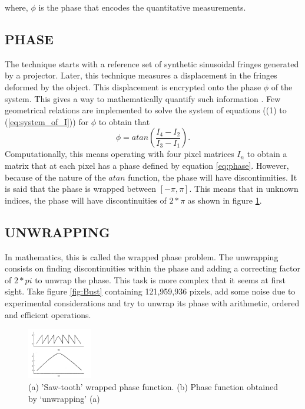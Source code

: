 where, $\phi$ is the phase that encodes the quantitative measurements. 

\subsection{PHASE}
The technique starts with a reference set of synthetic sinusoidal fringes generated by a projector. Later, this technique measures a displacement in the fringes deformed by the object. This displacement is encrypted onto the phase $\phi$ of the system. This gives a way to mathematically quantify such information  \cite{gaasvik2003optical}. Few geometrical relations are implemented to solve the system of equations ((1) to (\ref{eq:system_of_I}))  for $\phi$ to obtain that 
\begin{equation}
    \phi = atan(\frac{I_4-I_2}{I_3-I_1}).
    \label{eq:phase}
\end{equation}
Computationally, this means operating with four pixel matrices $I_n$ to obtain a matrix that at each pixel has a phase defined by equation \ref{eq:phase}. However, because of the nature of the $atan$ function, the phase will have discontinuities. It is said that the phase is wrapped between $[-\pi, \pi]$. This means that in unknown indices, the phase will have discontinuities of $2*\pi$ as shown in figure \ref{fig:WRAPunwrap}.\\


\subsection{UNWRAPPING}
In mathematics, this is called the wrapped phase problem. The unwrapping consists on finding discontinuities within the phase and adding a correcting factor of $2*pi$ to unwrap the phase\cite{Huntley:93}\cite{Ghiglia:94}. This task is more complex that it seems at first sight. Take figure \ref{fig:Bust} containing 121,959,936 pixels, add some noise due to experimental considerations and try to unwrap its phase with arithmetic, ordered and efficient operations. 

\begin{figure}[H]
    \centering
    \includegraphics[width=0.25\textwidth]{Figures/UnwrappIlustration.jpg}
    \caption{(a) 'Saw-tooth’ wrapped phase function. (b) Phase function obtained by ‘unwrapping’ (a) \cite{gaasvik2003optical}}
    \label{fig:WRAPunwrap}
\end{figure}


